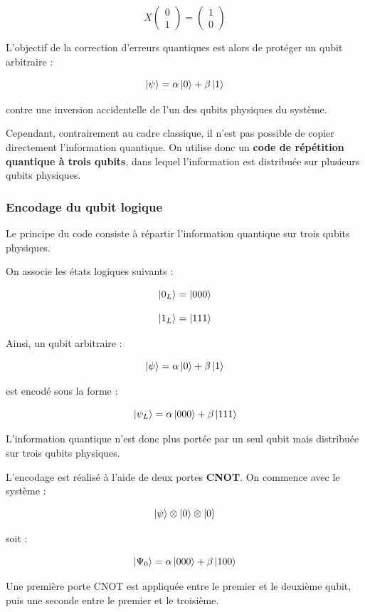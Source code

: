 \documentclass[a4paper,12pt]{article}
\begin{document}
\[
X
\begin{pmatrix}
0\\
1
\end{pmatrix}
=
\begin{pmatrix}
1\\
0
\end{pmatrix}
\]

L’objectif de la correction d’erreurs quantiques est alors de protéger un qubit arbitraire :

\[
\ket{\psi}
=
\alpha\ket{0}
+
\beta\ket{1}
\]

contre une inversion accidentelle de l’un des qubits physiques du système.

Cependant, contrairement au cadre classique, il n’est pas possible de copier directement l’information quantique. On utilise donc un \textbf{code de répétition quantique à trois qubits}, dans lequel l’information est distribuée sur plusieurs qubits physiques.

\subsubsection{Encodage du qubit logique}

Le principe du code consiste à répartir l’information quantique sur trois qubits physiques.

On associe les états logiques suivants :

\[
\ket{0_L}
=
\ket{000}
\]

\[
\ket{1_L}
=
\ket{111}
\]

Ainsi, un qubit arbitraire :

\[
\ket{\psi}
=
\alpha\ket{0}
+
\beta\ket{1}
\]

est encodé sous la forme :

\[
\ket{\psi_L}
=
\alpha\ket{000}
+
\beta\ket{111}
\]

L’information quantique n’est donc plus portée par un seul qubit mais distribuée sur trois qubits physiques.

L’encodage est réalisé à l’aide de deux portes \textbf{CNOT}. On commence avec le système :

\[
\ket{\psi}
\otimes
\ket{0}
\otimes
\ket{0}
\]

soit :

\[
\ket{\Psi_0}
=
\alpha\ket{000}
+
\beta\ket{100}
\]

Une première porte CNOT est appliquée entre le premier et le deuxième qubit, puis une seconde entre le premier et le troisième.
\end{document}
